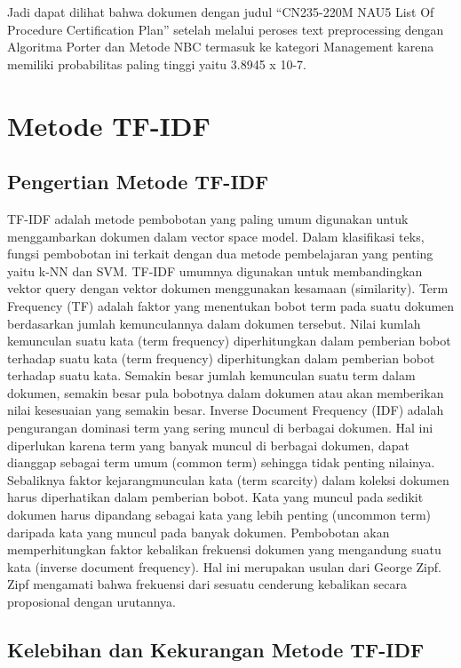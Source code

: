 \par Jadi dapat dilihat bahwa dokumen dengan judul “CN235-220M NAU5 List Of Procedure Certification Plan” setelah melalui peroses text preprocessing dengan Algoritma Porter dan Metode NBC termasuk ke kategori Management karena memiliki probabilitas paling tinggi yaitu 3.8945 x 10-7.


\section{Metode TF-IDF}
\subsection{Pengertian Metode TF-IDF} 
TF-IDF adalah metode pembobotan yang paling umum digunakan untuk menggambarkan dokumen dalam vector space model. Dalam klasifikasi teks, fungsi pembobotan ini terkait dengan dua metode pembelajaran yang penting yaitu k-NN dan SVM. TF-IDF umumnya digunakan untuk membandingkan vektor query dengan vektor dokumen menggunakan kesamaan (similarity).
Term Frequency (TF) adalah faktor yang menentukan bobot term pada suatu dokumen berdasarkan jumlah kemunculannya dalam dokumen tersebut. Nilai kumlah kemunculan suatu kata (term frequency) diperhitungkan dalam pemberian bobot terhadap suatu kata
(term frequency) diperhitungkan dalam pemberian bobot terhadap suatu kata. 
Semakin besar jumlah kemunculan suatu term dalam dokumen, semakin besar pula bobotnya dalam dokumen atau akan memberikan nilai kesesuaian yang semakin besar.
Inverse Document Frequency (IDF) adalah pengurangan dominasi term yang sering muncul di berbagai dokumen. Hal ini diperlukan karena term yang banyak muncul di berbagai dokumen, dapat dianggap sebagai term umum (common term) sehingga tidak penting nilainya.
Sebaliknya faktor kejarangmunculan kata (term scarcity) dalam koleksi dokumen harus diperhatikan dalam pemberian bobot. 
Kata yang muncul pada sedikit dokumen harus dipandang sebagai kata yang lebih penting (uncommon term) daripada kata yang muncul pada banyak dokumen. 
Pembobotan akan memperhitungkan faktor kebalikan frekuensi dokumen yang mengandung suatu kata (inverse document frequency). Hal ini merupakan usulan dari George Zipf. 
Zipf mengamati bahwa frekuensi dari sesuatu cenderung kebalikan secara proposional dengan urutannya.

\subsection{Kelebihan dan Kekurangan Metode TF-IDF}

